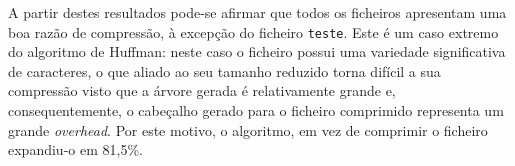   A partir destes resultados pode-se afirmar que todos os ficheiros apresentam uma boa razão de compressão, à excepção do ficheiro \texttt{teste}. Este é um caso extremo do algoritmo de Huffman: neste caso o ficheiro possui uma variedade significativa de caracteres, o que aliado ao seu tamanho reduzido torna difícil a sua compressão visto que a árvore gerada é relativamente grande e, consequentemente, o cabeçalho gerado para o ficheiro comprimido representa um grande \textit{overhead}. Por este motivo, o algoritmo, em vez de comprimir o ficheiro expandiu-o em 81,5\%.

